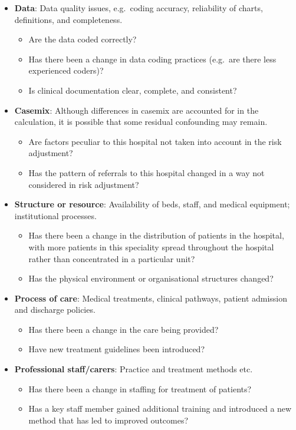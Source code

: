 \documentclass[
]{book}
\providecommand{\tightlist}{%
  \setlength{\itemsep}{0pt}\setlength{\parskip}{0pt}}
\begin{document}
\begin{itemize}
\tightlist
\item
  \textbf{Data}: Data quality issues, e.g.~coding accuracy, reliability of charts, definitions, and completeness.

  \begin{itemize}
  \tightlist
  \item
    Are the data coded correctly?
  \item
    Has there been a change in data coding practices (e.g.~are there less experienced coders)?
  \item
    Is clinical documentation clear, complete, and consistent?
  \end{itemize}
\item
  \textbf{Casemix}: Although differences in casemix are accounted for in the calculation, it is possible that some residual confounding may remain.

  \begin{itemize}
  \tightlist
  \item
    Are factors peculiar to this hospital not taken into account in the risk adjustment?
  \item
    Has the pattern of referrals to this hospital changed in a way not considered in risk adjustment?
  \end{itemize}
\item
  \textbf{Structure or resource}: Availability of beds, staff, and medical equipment; institutional processes.

  \begin{itemize}
  \tightlist
  \item
    Has there been a change in the distribution of patients in the hospital, with more patients in this speciality spread throughout the hospital rather than concentrated in a particular unit?
  \item
    Has the physical environment or organisational structures changed?
  \end{itemize}
\item
  \textbf{Process of care}: Medical treatments, clinical pathways, patient admission and discharge policies.

  \begin{itemize}
  \tightlist
  \item
    Has there been a change in the care being provided?
  \item
    Have new treatment guidelines been introduced?
  \end{itemize}
\item
  \textbf{Professional staff/carers}: Practice and treatment methods etc.

  \begin{itemize}
  \tightlist
  \item
    Has there been a change in staffing for treatment of patients?
  \item
    Has a key staff member gained additional training and introduced a new method that has led to improved outcomes?
  \end{itemize}
\end{itemize}
\end{document}
